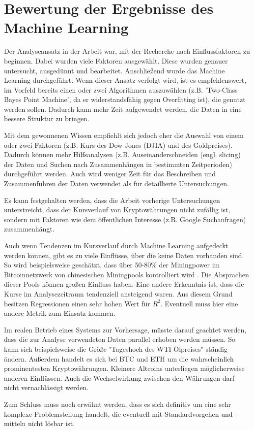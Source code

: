 \section{Bewertung der Ergebnisse des Machine Learning}\label{sec:BewertungML}
Der Analyseansatz in der Arbeit war, mit der Recherche nach Einflussfaktoren zu beginnen. Dabei wurden viele Faktoren ausgewählt. Diese wurden genauer untersucht, ausgedünnt und bearbeitet. Anschließend wurde das Machine Learning durchgeführt. Wenn dieser Ansatz verfolgt wird, ist es empfehlenswert, im Vorfeld bereits einen oder zwei Algorithmen auszuwählen (z.B. 'Two-Class Bayes Point Machine', da er widerstandsfähig gegen Overfitting ist), die genutzt werden sollen. Dadurch kann mehr Zeit aufgewendet werden, die Daten in eine bessere Struktur zu bringen.\par
Mit dem gewonnenen Wissen empfiehlt sich jedoch eher die Auswahl von einem oder zwei Faktoren (z.B. Kurs des Dow Jones (DJIA) und des Goldpreises). Dadurch können mehr Hilfsanalysen (z.B. Auseinanderschneiden (engl. slicing) der Daten und Suchen nach Zusammenhängen in bestimmten Zeitperioden) durchgeführt werden. Auch wird weniger Zeit für das Beschreiben und Zusammenführen der Daten verwendet als für detaillierte Untersuchungen.\par
Es kann festgehalten werden, dass die Arbeit vorherige Untersuchungen unterstreicht, dass der Kursverlauf von Kryptowährungen nicht zufällig ist, sondern mit Faktoren wie dem öffentlichen Interesse (z.B. Google Suchanfragen) zusammenhängt.\par
Auch wenn Tendenzen im Kursverlauf durch Machine Learning aufgedeckt werden können, gibt es zu viele Einflüsse, über die keine Daten vorhanden sind. So wird beispielsweise geschätzt, dass über 50-80\% der Miningpower im Bitcoinnetzwerk von chinesischen Miningpools kontrolliert wird . Die Absprachen dieser Pools können großen Einfluss haben. 
Eine andere Erkenntnis ist, dass die Kurse im Analysezeitraum tendenziell ansteigend waren. Aus diesem Grund besitzen Regressionen einen sehr hohen Wert für $ R^2 $. Eventuell muss hier eine andere Metrik zum Einsatz kommen.\par
Im realen Betrieb eines Systems zur Vorhersage, müsste darauf geachtet werden, dass die zur Analyse verwendeten Daten parallel erhoben werden müssen. So kann sich beispielsweise die Größe "Tageshoch des WTI-Ölpreises" ständig ändern. Außerdem handelt es sich bei BTC und ETH um die wahrscheinlich prominentesten Kryptowährungen. Kleinere Altcoins unterliegen möglicherweise anderen Einflüssen. Auch die Wechselwirkung zwischen den Währungen darf nicht vernachlässigt werden.\par
Zum Schluss muss noch erwähnt werden, dass es sich definitiv um eine sehr komplexe Problemstellung handelt, die eventuell mit Standardvorgehen und -mitteln nicht lösbar ist.